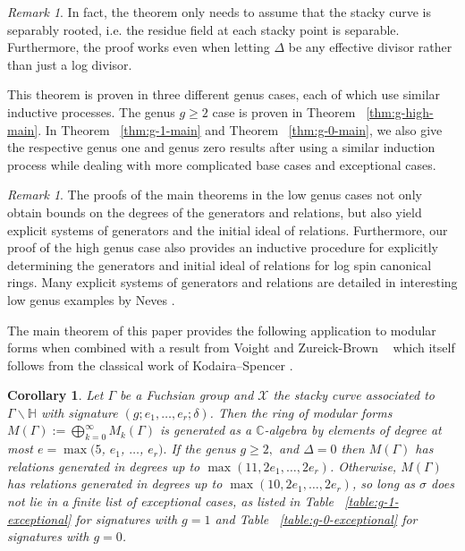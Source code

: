 \documentclass{amsart}
\theoremstyle{plain}
\newtheorem{cor}[thm]{Corollary}
\theoremstyle{definition}
\theoremstyle{remark}
\newtheorem{rem}[thm]{Remark}
\numberwithin{equation}{section}
\newcommand\BH{{\mathbb H}}
\newcommand\BC{{\mathbb C}}
\newcommand \sx{\mathscr X}
\begin{document}
\begin{rem}
\label{rem:main-weaker-assumptions}
In fact, the theorem only needs to assume that the stacky curve
is separably rooted, i.e. the residue field at each stacky point
is separable. Furthermore, the proof works even when letting
$\Delta$ be any effective divisor rather than just a log divisor.
\end{rem}

This theorem is proven in three different genus cases, each of
which use similar inductive processes. The genus $g \geq 2$ case is
proven in Theorem ~\ref{thm:g-high-main}. In Theorem
~\ref{thm:g-1-main} and Theorem
~\ref{thm:g-0-main}, we also give the respective
genus one and genus zero results after using a similar induction
process while dealing with more complicated base cases and
exceptional cases.

\begin{rem}
\label{rem:explicit-generators}
The proofs of the main theorems in the low genus cases not only
obtain bounds on the degrees of the generators and relations, but
also yield explicit systems of generators and the initial ideal of
relations. Furthermore, our proof of the high genus case also
provides an inductive procedure for explicitly determining the 
generators and initial ideal of relations for log spin canonical
rings. Many explicit systems of generators and relations are
detailed in interesting low genus examples by Neves
\cite[Section III.4]{neves:halfcan}.
\end{rem}

The main theorem of this paper provides the following application
to modular forms when combined with a result from Voight and
Zureick-Brown ~\cite[Lemma 10.2.1]{vzb:stacky} which itself
follows from the classical work of Kodaira--Spencer
\cite{kodaira-spencer:deformations}.

\begin{cor}
\label{cor:main-mod-forms}
Let $\Gamma$ be a Fuchsian group and $\sx$ the stacky curve
associated to $\Gamma \backslash \BH$ with signature $(g; e_1,
\ldots, e_r; \delta)$. Then the ring of modular forms
$M(\Gamma) := \bigoplus_{k = 0}^{\infty} M_k(\Gamma)$ is
generated as a $\BC$-algebra by elements of degree at most $e = \max
 (5$, $e_1$, $\ldots$, $e_r).$ If the genus $g \geq 2,$ and $\Delta = 0$
then $M(\Gamma)$ has relations generated in degrees up to $\max(11,
2e_1, \ldots, 2e_r)$. Otherwise, $M(\Gamma)$ has relations
generated in degrees up to $\max(10, 2e_1, \ldots, 2e_r)$, so long
as $\sigma$ does not lie in a finite list of exceptional cases, as
listed in Table ~\ref{table:g-1-exceptional} for signatures with $g
= 1$ and Table ~\ref{table:g-0-exceptional} for signatures with $g =
0$.
\end{cor}
\end{document}
